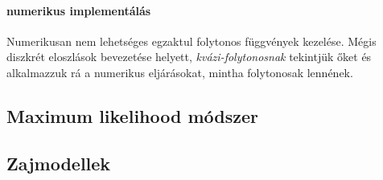 \paragraph{numerikus implementálás}
Numerikusan nem lehetséges egzaktul folytonos függvények kezelése. Mégis diszkrét eloszlások bevezetése helyett, \textit{kvázi-folytonosnak} tekintjük őket és alkalmazzuk rá a numerikus eljárásokat, mintha folytonosak lennének.

\subsection{Maximum likelihood módszer}

\subsection{Zajmodellek}